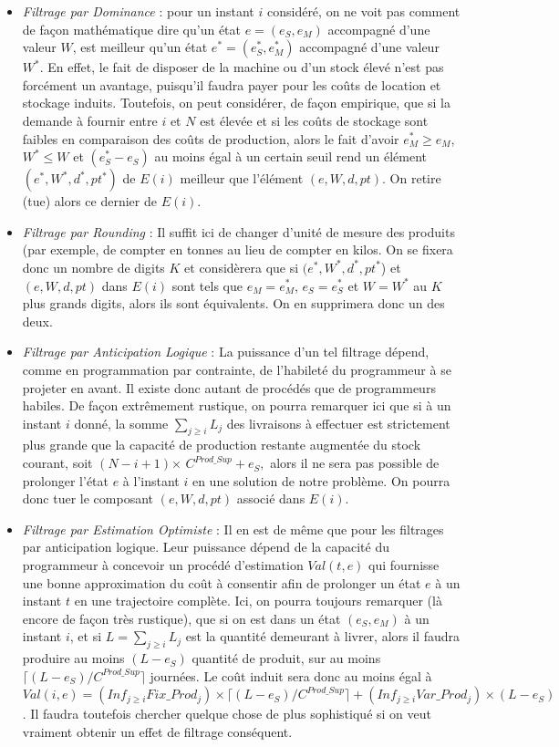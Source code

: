 \begin{itemize}[label=$\square$]
	\item	\textit{Filtrage par Dominance} : pour un instant $i$ considéré, on ne voit pas comment de façon mathématique dire qu'un état $e = (e_S, e_M)$ accompagné d'une valeur $W$, est meilleur qu'un état $e^* = (e^*_S, e^*_M)$ accompagné d'une valeur $W^*$. En effet, le fait de disposer de la machine ou d'un stock élevé n'est pas forcément un avantage, puisqu'il faudra payer pour les coûts de location et stockage induits. Toutefois, on peut considérer, de façon empirique,  que si la demande à fournir entre $i$ et $N$ est élevée et si les coûts de stockage sont faibles en comparaison des coûts de production, alors le fait d'avoir $e^*_M \geq e_M$, $W^* \leq W$ et $(e^*_S - e_S)$ au moins égal à un certain seuil rend un élément $(e^*, W^*, d^*, pt^*)$ de $E(i)$ meilleur que l'élément $(e, W, d, pt)$. On retire (tue) alors ce dernier de $E(i)$. 
	\item	\textit{Filtrage par Rounding} : Il suffit ici de changer d'unité de mesure des produits (par exemple, de compter en tonnes au lieu de compter en kilos. On se fixera donc un nombre de digits $K$ et considèrera que si $(e^*, W^*, d^*, pt^*$) et $(e, W, d, pt)$ dans $E(i)$ sont tels que $e_M = e^*_M$, $e_S = e^*_S$ et $W = W^*$ au $K$ plus grands digits, alors ils sont équivalents. On en supprimera donc un des deux.
	\item	\textit{Filtrage par Anticipation Logique} : La puissance d'un tel filtrage dépend, comme en programmation par contrainte, de l'habileté du programmeur à se projeter en avant. Il existe donc autant de procédés que de programmeurs habiles. De façon extrêmement rustique, on pourra remarquer ici que si à un instant $i$ donné, la somme $\sum_{ j \geq i} L_j$ des livraisons à effectuer est strictement plus grande que la capacité de production restante augmentée du stock courant, soit $(N- i+ 1)$$\times$ $C^{Prod\_Sup} + e_S,$ alors il ne sera pas possible de prolonger l'état $e$ à l'instant $i$ en une solution de notre problème. On pourra donc tuer le composant $(e, W, d, pt)$ associé dans $E(i)$.
	\item	\textit{Filtrage par Estimation Optimiste} : Il en est de même que pour les filtrages par anticipation logique. Leur puissance dépend de la capacité du programmeur à concevoir un procédé d'estimation $Val(t, e)$ qui fournisse une bonne approximation du coût à consentir afin de prolonger un état $e$ à un instant $t$ en une trajectoire complète. Ici, on pourra toujours remarquer (là encore de façon très rustique), que si on est dans un état $(e_S, e_M)$ à un instant $i$, et si $L = \sum_{ j \geq i} L_j$ est la quantité demeurant à livrer, alors il faudra produire au moins $(L -  e_S)$ quantité de produit, sur au moins $\lceil (L -  e_S)/ C^{Prod\_Sup}\rceil$ journées. Le coût induit sera donc au moins égal à $Val(i, e)  = (Inf_{j \geq i} Fix\_Prod_j) \times \lceil(L - e_S)/ C^{Prod\_Sup}\rceil  + (Inf_{j \geq i} Var\_Prod_j)\times (L -  e_S)$. Il faudra toutefois chercher quelque chose de plus sophistiqué si on veut vraiment obtenir un effet de filtrage conséquent.
	
\end{itemize}

